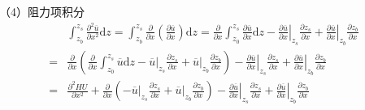 （4）阻力项积分
\begin{equation}
  \begin{aligned}
    &\int_{z_{b}}^{ z_{s}}\!
    \frac{\partial^{2} \overline{u}}{\partial x^{2}}
    \mathrm{d}z
    =
    \int_{z_{b}}^{ z_{s}}\!
    \frac{\partial}{\partial x}
    \left(\frac{\partial \overline{u}}{\partial x}\right)
    \mathrm{d}z
    =
    \frac{\partial}{\partial x}
    \int_{z_0}^{ z_{s}}\!
    \frac{\partial \overline{u}}{\partial x}
    \mathrm{d}z
    -
    \left.\frac{\partial \overline{u}}{\partial x}\right|_{z_{s}}\frac{\partial  z_{s}}{\partial x}
    +
    \left.\frac{\partial \overline{u}}{\partial x}\right|_{z_{b}}\frac{\partial z_{b}}{\partial x}
    \\
    =&
    \frac{\partial}{\partial x}
    \left(
    \frac{\partial}{\partial x}
    \int_{z_0}^{ z_{s}}\!
    \overline{u}
    \mathrm{d}z
    -
    \left.\overline{u}\right|_{z_{s}}\frac{\partial  z_{s}}{\partial x}
    +
    \left.\overline{u}\right|_{z_{b}}\frac{\partial z_{b}}{\partial x}
    \right)
    -
    \left.\frac{\partial \overline{u}}{\partial x}\right|_{z_{s}}\frac{\partial  z_{s}}{\partial x}
    +
    \left.\frac{\partial \overline{u}}{\partial x}\right|_{z_{b}}\frac{\partial z_{b}}{\partial x}
      \\
    =&
    \frac{\partial^{2} HU}{\partial x^{2}} +
    \frac{\partial}{\partial x}
    \left(
    -
    \left.\overline{u}\right|_{z_{s}}\frac{\partial  z_{s}}{\partial x}
    +
    \left.\overline{u}\right|_{z_{b}}\frac{\partial z_{b}}{\partial x}
    \right)
    -
    \left.\frac{\partial \overline{u}}{\partial x}\right|_{z_{s}}\frac{\partial  z_{s}}{\partial x}
    +
    \left.\frac{\partial \overline{u}}{\partial x}\right|_{z_{b}}\frac{\partial z_{b}}{\partial x}
  \end{aligned}
  \label{EqCGe_Shear_1}
\end{equation}

